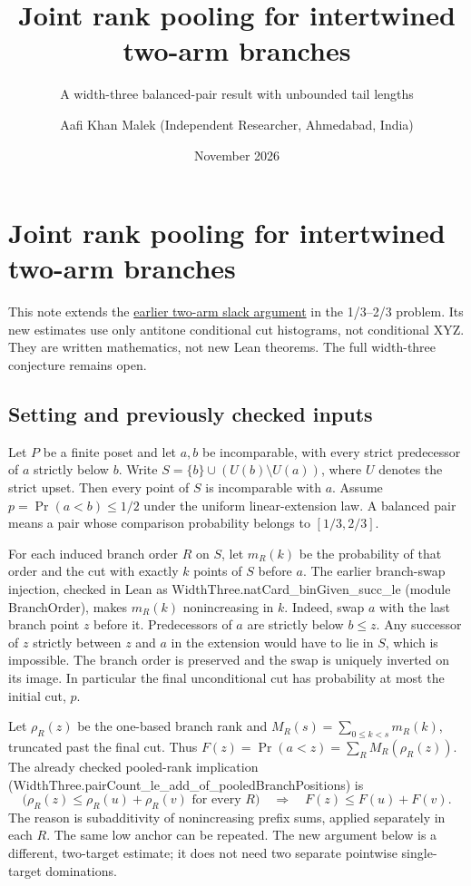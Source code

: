 \documentclass[
  11pt,
]{article}
\title{Joint rank pooling for intertwined two-arm branches}
\subtitle{A width-three balanced-pair result with unbounded tail
lengths}
\author{Aafi Khan Malek (Independent Researcher, Ahmedabad, India)}
\date{November 2026}
\begin{document}
\maketitle

\section{Joint rank pooling for intertwined two-arm
branches}\label{joint-rank-pooling-for-intertwined-two-arm-branches}

This note extends the
\href{https://github.com/Aafimalek/novel-discoveries/tree/6add80bc727aef16d920be7ce39d8312fed99a87/width-three-posets/verification/conditional-xyz-two-arm-slack}{earlier
two-arm slack argument} in the 1/3--2/3 problem. Its new estimates use
only antitone conditional cut histograms, not conditional XYZ. They are
written mathematics, not new Lean theorems. The full width-three
conjecture remains open.

\subsection{Setting and previously checked
inputs}\label{setting-and-previously-checked-inputs}

Let \(P\) be a finite poset and let \(a,b\) be incomparable, with every
strict predecessor of \(a\) strictly below \(b\). Write
\(S=\{b\}\cup(U(b)\setminus U(a))\), where \(U\) denotes the strict
upset. Then every point of \(S\) is incomparable with \(a\). Assume
\(p=\Pr(a<b)\le1/2\) under the uniform linear-extension law. A balanced
pair means a pair whose comparison probability belongs to \([1/3,2/3]\).

For each induced branch order \(R\) on \(S\), let \(m_R(k)\) be the
probability of that order and the cut with exactly \(k\) points of \(S\)
before \(a\). The earlier branch-swap injection, checked in Lean as
WidthThree.natCard\_binGiven\_succ\_le (module BranchOrder), makes
\(m_R(k)\) nonincreasing in \(k\). Indeed, swap \(a\) with the last
branch point \(z\) before it. Predecessors of \(a\) are strictly below
\(b\le z\). Any successor of \(z\) strictly between \(z\) and \(a\) in
the extension would have to lie in \(S\), which is impossible. The
branch order is preserved and the swap is uniquely inverted on its
image. In particular the final unconditional cut has probability at most
the initial cut, \(p\).

Let \(\rho_R(z)\) be the one-based branch rank and
\(M_R(s)=\sum_{0\le k<s}m_R(k)\), truncated past the final cut. Thus
\(F(z)=\Pr(a<z)=\sum_R M_R(\rho_R(z))\). The already checked pooled-rank
implication (WidthThree.pairCount\_le\_add\_of\_pooledBranchPositions)
is \[
 \bigl(\rho_R(z)\le\rho_R(u)+\rho_R(v)\text{ for every }R\bigr)
 \quad\Longrightarrow\quad F(z)\le F(u)+F(v).
\] The reason is subadditivity of nonincreasing prefix sums, applied
separately in each \(R\). The same low anchor can be repeated. The new
argument below is a different, two-target estimate; it does not need two
separate pointwise single-target dominations.
\end{document}
